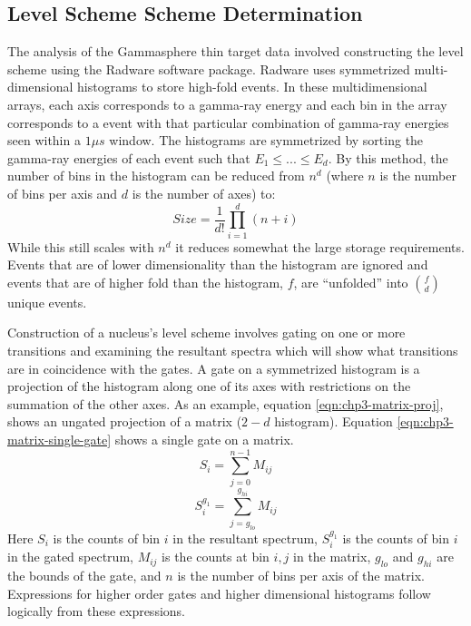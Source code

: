 \subsection{Level Scheme Scheme Determination}
\label{ssec:exp-pr-data-proc-lvl-scheme}
The analysis of the Gammasphere thin target data involved constructing the level scheme using the Radware software package\cite{radware}. Radware uses symmetrized multi-dimensional histograms to store high-fold events. In these multidimensional arrays, each axis corresponds to a gamma-ray energy and each bin in the array corresponds to a event with that particular combination of gamma-ray energies seen within a $1\mu{}s$ window. The histograms are symmetrized by sorting the gamma-ray energies of each event such that $E_1\leq{}...\leq{}E_d$. By this method, the number of bins in the histogram can be reduced from $n^d$ (where $n$ is the number of bins per axis and $d$ is the number of axes) to:
\begin{equation}
\label{eqn:chp3-hist-size}
Size=\frac{1}{d!}\prod\limits_{i=1}^{d}(n+i)
\end{equation}
While this still scales with $n^d$ it reduces somewhat the large storage requirements. Events that are of lower dimensionality than the histogram are ignored and events that are of higher fold than the histogram, $f$, are ``unfolded'' into $f \choose d$ unique events.

Construction of a nucleus's level scheme involves gating on one or more transitions and examining the resultant spectra which will show what transitions are in coincidence with the gates. A gate on a symmetrized histogram is a projection of the histogram along one of its axes with restrictions on the summation of the other axes. As an example, equation \ref{eqn:chp3-matrix-proj}, shows an ungated projection of a matrix ($2-d$ histogram). Equation \ref{eqn:chp3-matrix-single-gate} shows a single gate on a matrix.
\begin{equation}
\label{eqn:chp3-matrix-proj}
S_i = \sum\limits_{j=0}^{n-1}M_{ij}
\end{equation}
\begin{equation}
\label{eqn:chp3-matrix-single-gate}
S^{g_1}_i = \sum\limits_{j=g_{lo}}^{g_{hi}}M_{ij}
\end{equation}
Here $S_i$ is the counts of bin $i$ in the resultant spectrum, $S^{g_1}_i$ is the counts of bin $i$ in the gated spectrum, $M_{ij}$ is the counts at bin $i,j$ in the matrix, $g_{lo}$ and $g_{hi}$ are the bounds of the gate, and $n$ is the number of bins per axis of the matrix. Expressions for higher order gates and higher dimensional histograms follow logically from these expressions.

